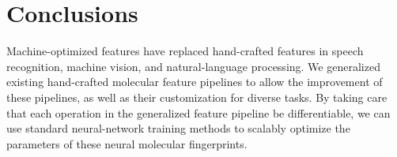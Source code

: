 \documentclass{article}
\begin{document}
\section{Conclusions}
Machine-optimized features have replaced hand-crafted features in speech recognition, machine vision, and natural-language processing.
We generalized existing hand-crafted molecular feature pipelines to allow the improvement of these pipelines, as well as their customization for diverse tasks.
By taking care that each operation in the generalized feature pipeline be differentiable, we can use standard neural-network training methods to scalably optimize the parameters of these neural molecular fingerprints.



\end{document}
